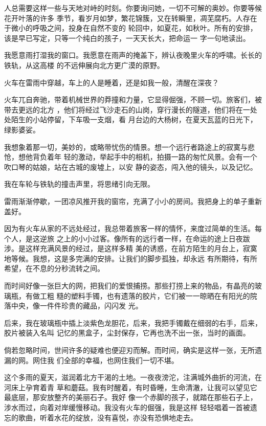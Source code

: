 \documentclass[12pt,a4paper]{article}
\begin{document}
		人总需要这样一些与天地对峙的时刻。你要询问她，一切不可解的奥妙。你要等候花开叶落的许多
	季节，看岁月如梦，繁花锦簇，又在转瞬里，凋芜腐朽。人存在于微小的呼吸之间，投身在自然不变的
	轮回中，如夏花，如秋叶。所有的安排，该是早已写定，只等一个纯白的孩子，一天天长大，把命运一
	字一句地读出。

		我愿意雨打湿我的窗口。我愿意在雨声的掩盖下，辨认夜晚里火车的呼啸。长长的铁轨，从这高楼
	的不远伸展向北方更广漠的原野。

		火车在雷雨中穿越，车上的人是睡着，还是如我一般，清醒在深夜？

		火车兀自奔驰，带着机械世界的莽撞和力量，它显得倔强，不顾一切。旅客们，被带去更远的北方
	，他们将经过飞沙走石的山岗，穿行漫长的隧道，他们将在一处处陌生的小站停留，下车吸一支烟，看
	月台边的大杨树，在夏天瓦蓝的日光下，绿影婆娑。

		我想象着那一切，美妙的，或略带忧伤的情景。想一个远行者路途上的寂寞与悲怆，想他背负着年
	轻的激动，举起手中的相机，拍摄一路的匆忙风景。会有一个吹口琴的姑娘，站在古城的废墟上，以安
	静的姿态，闯入他的镜头，以及记忆。

		我在车轮与铁轨的撞击声里，将思绪引向无限。

		雷雨渐渐停歇，一团凉风推开我的窗帘，充满了小小的房间。我把身上的单子重新盖好。

		因为有火车从家的不远处经过，我总带着旅客一样的情怀，来度过简单的生活。每个人，是这逆旅
	之上的小小过客。像所有的远行者一样，在命运的途上日夜跋涉。是这样充满风景的经过，是这样多精
	美的诱惑，在前方陌生的月台上，寂寞地等候。我想，这是多完满的安排。让我们的脚步孤独，却永远
	有所期待，有所希望，在不息的分秒流转之间。

		而时间好像一张巨大的网，把我们的爱恨捕捞。那些打捞上来的物品，有晶亮的玻璃瓶，有做工粗
	糙的塑料手镯，也有遗落的胶片，它们被一一晾晒在有阳光的院落中央，像一件件珍贵的藏品，闪闪发
	光。

		后来，我在玻璃瓶中插上淡紫色龙胆花，后来，我把手镯戴在细弱的右手，后来，胶片被装入名叫
	记忆的黑盒子，尘封保存，它再也洗不出一张，当时的画面。

		倘若忽略时间，世间许多的疑难也便迎刃而解。而时间，确实是这样一张，无所遗漏的网。网住我
	们全部的幸福，也网住我们一切不堪。

		这个多雨的夏天，滋润着北方干渴的土地。一夜夜滂沱，注满城外曲折的河流，在河床上孕育着青
	草和蘑菇。我有时醒着，有时昏睡，生命清澈，让我可以望见它最底层，那安放整齐的美丽石子。我好
	像一个赤脚的孩子，就踏在那些石子上，涉水而过，向着对岸缓慢移动。我没有火车的倔强，我是这样
	轻轻唱着一首被遗忘的歌曲，听着水花的绽放，没有喜悦，亦没有恐惧地走去。
\end{document}
